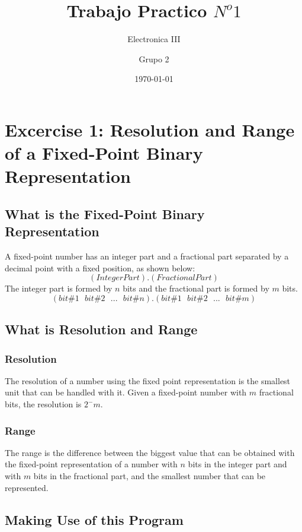 \documentclass[a4paper,12pt]{report}
\begin{document}
\title{\color{magenta}Trabajo Practico $N^o 1$}
\author{Electronica III}
\author{Grupo 2}
\date{\today} %

\maketitle

\section{Excercise 1: Resolution and Range of a Fixed-Point Binary Representation}

\subsection{What is the Fixed-Point Binary Representation}
A fixed-point number has an integer part and a fractional part separated by a decimal point with a fixed position, as shown below:
$$ (Integer Part).(Fractional Part)$$
The integer part is formed by $n$ bits and the fractional part is formed by $m$ bits.
$$ (bit \#1\ \ \ bit \#2\ \ \ ...\ \ \ bit \#n).(bit \#1\ \ \ bit \#2\ \ \ ...\ \ \ bit \#m)$$

\subsection{What is Resolution and Range}
\subsubsection{Resolution}
The resolution of a number using the fixed point representation is the smallest unit that can be handled with it.
Given a fixed-point number with $m$ fractional bits, the resolution is $2^-m$.
\subsubsection{Range}
The range is the difference between the biggest value that can be obtained with the fixed-point representation of a number with $n$ bits in the integer part and with $m$ bits in the fractional part, and the smallest number that can be represented.

\subsection{Making Use of this Program}
\end{document}

